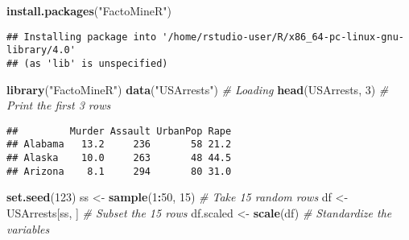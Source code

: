 \documentclass[
]{article}
\newenvironment{Shaded}{\begin{snugshade}}{\end{snugshade}}
\newcommand{\CommentTok}[1]{\textcolor[rgb]{0.56,0.35,0.01}{\textit{#1}}}
\newcommand{\DecValTok}[1]{\textcolor[rgb]{0.00,0.00,0.81}{#1}}
\newcommand{\KeywordTok}[1]{\textcolor[rgb]{0.13,0.29,0.53}{\textbf{#1}}}
\newcommand{\NormalTok}[1]{#1}
\newcommand{\OperatorTok}[1]{\textcolor[rgb]{0.81,0.36,0.00}{\textbf{#1}}}
\newcommand{\StringTok}[1]{\textcolor[rgb]{0.31,0.60,0.02}{#1}}
\begin{document}
\begin{Shaded}
\begin{Highlighting}[]
\KeywordTok{install.packages}\NormalTok{(}\StringTok{"FactoMineR"}\NormalTok{)}
\end{Highlighting}
\end{Shaded}

\begin{verbatim}
## Installing package into '/home/rstudio-user/R/x86_64-pc-linux-gnu-library/4.0'
## (as 'lib' is unspecified)
\end{verbatim}

\begin{Shaded}
\begin{Highlighting}[]
\KeywordTok{library}\NormalTok{(}\StringTok{"FactoMineR"}\NormalTok{)}
\KeywordTok{data}\NormalTok{(}\StringTok{"USArrests"}\NormalTok{) }\CommentTok{# Loading}
\KeywordTok{head}\NormalTok{(USArrests, }\DecValTok{3}\NormalTok{) }\CommentTok{# Print the first 3 rows}
\end{Highlighting}
\end{Shaded}

\begin{verbatim}
##         Murder Assault UrbanPop Rape
## Alabama   13.2     236       58 21.2
## Alaska    10.0     263       48 44.5
## Arizona    8.1     294       80 31.0
\end{verbatim}

\begin{Shaded}
\begin{Highlighting}[]
\KeywordTok{set.seed}\NormalTok{(}\DecValTok{123}\NormalTok{)}
\NormalTok{ss <-}\StringTok{ }\KeywordTok{sample}\NormalTok{(}\DecValTok{1}\OperatorTok{:}\DecValTok{50}\NormalTok{, }\DecValTok{15}\NormalTok{) }\CommentTok{# Take 15 random rows}
\NormalTok{df <-}\StringTok{ }\NormalTok{USArrests[ss, ] }\CommentTok{# Subset the 15 rows}
\NormalTok{df.scaled <-}\StringTok{ }\KeywordTok{scale}\NormalTok{(df) }\CommentTok{# Standardize the variables}
\end{Highlighting}
\end{Shaded}
\end{document}
